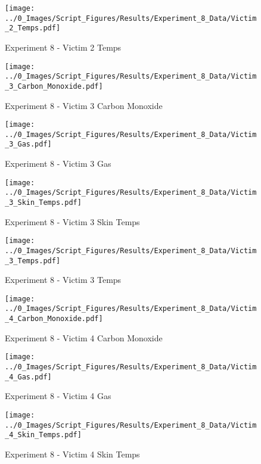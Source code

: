	\begin{figure}[H]
		\centering
		\texttt{[image: ../0\_Images/Script\_Figures/Results/Experiment\_8\_Data/Victim\_2\_Temps.pdf]}
		\caption[]{Experiment 8 - Victim 2 Temps}
	\end{figure}
 
	\clearpage

	\begin{figure}[H]
		\centering
		\texttt{[image: ../0\_Images/Script\_Figures/Results/Experiment\_8\_Data/Victim\_3\_Carbon\_Monoxide.pdf]}
		\caption[]{Experiment 8 - Victim 3 Carbon Monoxide}
	\end{figure}
 

	\begin{figure}[H]
		\centering
		\texttt{[image: ../0\_Images/Script\_Figures/Results/Experiment\_8\_Data/Victim\_3\_Gas.pdf]}
		\caption[]{Experiment 8 - Victim 3 Gas}
	\end{figure}
 
	\clearpage

	\begin{figure}[H]
		\centering
		\texttt{[image: ../0\_Images/Script\_Figures/Results/Experiment\_8\_Data/Victim\_3\_Skin\_Temps.pdf]}
		\caption[]{Experiment 8 - Victim 3 Skin Temps}
	\end{figure}
 

	\begin{figure}[H]
		\centering
		\texttt{[image: ../0\_Images/Script\_Figures/Results/Experiment\_8\_Data/Victim\_3\_Temps.pdf]}
		\caption[]{Experiment 8 - Victim 3 Temps}
	\end{figure}
 
	\clearpage

	\begin{figure}[H]
		\centering
		\texttt{[image: ../0\_Images/Script\_Figures/Results/Experiment\_8\_Data/Victim\_4\_Carbon\_Monoxide.pdf]}
		\caption[]{Experiment 8 - Victim 4 Carbon Monoxide}
	\end{figure}
 

	\begin{figure}[H]
		\centering
		\texttt{[image: ../0\_Images/Script\_Figures/Results/Experiment\_8\_Data/Victim\_4\_Gas.pdf]}
		\caption[]{Experiment 8 - Victim 4 Gas}
	\end{figure}
 
	\clearpage

	\begin{figure}[H]
		\centering
		\texttt{[image: ../0\_Images/Script\_Figures/Results/Experiment\_8\_Data/Victim\_4\_Skin\_Temps.pdf]}
		\caption[]{Experiment 8 - Victim 4 Skin Temps}
	\end{figure}
 


